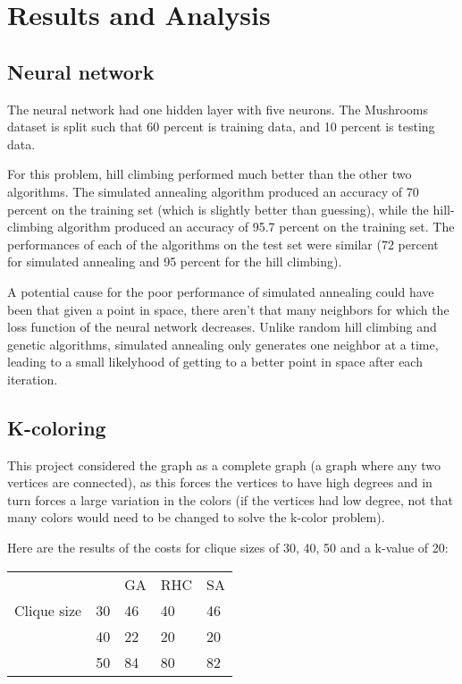 \documentclass[11pt]{article}
\begin{document}
        \section{Results and Analysis}

        \subsection{Neural network}
        The neural network had one hidden layer
        with five neurons. The Mushrooms dataset is split such that 60 percent is training data, and 10 percent is testing data.

        For this problem, hill climbing performed much better than the other two algorithms.
        The simulated annealing algorithm produced an accuracy of 70 percent on the training set (which is slightly better
        than guessing), while the hill-climbing algorithm produced an accuracy of 95.7 percent on the training set. The performances
        of each of the algorithms on the test set were similar (72 percent for simulated annealing and 95 percent for the hill climbing).

        A potential cause for the poor performance of simulated annealing could have been that given a point in space,
        there aren't that many neighbors for which the loss function of the neural network decreases.
        Unlike random hill climbing and genetic algorithms, simulated annealing only generates one neighbor at
        a time, leading to a small likelyhood of getting to a better point in space after each iteration.

        \subsection{K-coloring}

        This project considered the graph as a complete graph (a graph where any two vertices are connected), as this forces the vertices to have
        high degrees and in turn forces a large variation in the colors (if the vertices had low degree, not that many colors
        would need to be changed to solve the k-color problem).

        Here are the results of the costs for clique sizes of 30, 40, 50 and a k-value of 20:

            \begin{tabular}{lllll}
                        &    & GA & RHC & SA \\
            Clique size & 30 & 46 & 40  & 46 \\
                        & 40 & 22 & 20  & 20 \\
                        & 50 & 84 & 80  & 82
            \end{tabular}
       
\end{document}
